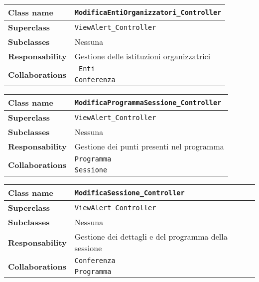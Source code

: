 \begin{table}[h!]
	\begin{tabular}{|l|l|}
		\hline 
		\textbf{Class name} & \texttt{ModificaEntiOrganizzatori\_Controller}
		\\ \hline
		\textbf{Superclass} & \texttt{ViewAlert\_Controller}
		\\ \hline
		\multirow{1}{*}{\textbf{Subclasses}} & Nessuna
		\\ \hline
		\textbf{Responsability} & Gestione delle istituzioni organizzatrici
		\\ \hline
		\multirow{2}{*}{\textbf{Collaborations}} &\texttt{ Enti }\\
		& \texttt{Conferenza	}	\\ \hline
	\end{tabular}
\end{table}
\begin{table}[h!]
	\begin{tabular}{|l|l|}
		\hline 
		\textbf{Class name} & \texttt{ModificaProgrammaSessione\_Controller}
		\\ \hline
		\textbf{Superclass} & \texttt{ViewAlert\_Controller}
		\\ \hline
		\multirow{1}{*}{\textbf{Subclasses}} & Nessuna
		\\ \hline
		\textbf{Responsability} & Gestione dei punti presenti nel programma
		\\ \hline
		\multirow{2}{*}{\textbf{Collaborations}} & \texttt{Programma} \\
		& \texttt{Sessione} 		\\ \hline
	\end{tabular}
\end{table}
\begin{table}[h!]
	\begin{tabular}{|l|l|}
		\hline 
		\textbf{Class name} & \texttt{ModificaSessione\_Controller}
		\\ \hline
		\textbf{Superclass} & \texttt{ViewAlert\_Controller}
		\\ \hline
		\multirow{1}{*}{\textbf{Subclasses}} & Nessuna
		\\ \hline
		\textbf{Responsability} & Gestione dei dettagli e del programma della sessione
		\\ \hline
		\multirow{2}{*}{\textbf{Collaborations}} & \texttt{Conferenza} \\
		& \texttt{Programma} \\ \hline
	\end{tabular}
\end{table}
